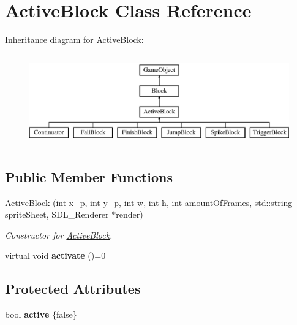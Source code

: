 \hypertarget{class_active_block}{}\section{Active\+Block Class Reference}
\label{class_active_block}
Inheritance diagram for Active\+Block\+:\begin{figure}[H]
\begin{center}
\leavevmode
\includegraphics[height=4.000000cm]{class_active_block}
\end{center}
\end{figure}
\subsection*{Public Member Functions}
\begin{DoxyCompactItemize}
\item 
\hyperlink{class_active_block_a631a75f968d3d168ff61098545e8944b}{Active\+Block} (int x\+\_\+p, int y\+\_\+p, int w, int h, int amount\+Of\+Frames, std\+::string sprite\+Sheet, S\+D\+L\+\_\+\+Renderer $\ast$render)
\begin{DoxyCompactList}\small\item\em Constructor for \hyperlink{class_active_block}{Active\+Block}. \end{DoxyCompactList}\item 
\hypertarget{class_active_block_a9c94c51ce316a6697e17b08f124e74f8}{}virtual void {\bfseries activate} ()=0\label{class_active_block_a9c94c51ce316a6697e17b08f124e74f8}

\end{DoxyCompactItemize}
\subsection*{Protected Attributes}
\begin{DoxyCompactItemize}
\item 
\hypertarget{class_active_block_a4672b4f64f461acd3f6d1c701c7e55cd}{}bool {\bfseries active} \{false\}\label{class_active_block_a4672b4f64f461acd3f6d1c701c7e55cd}

\end{DoxyCompactItemize}
